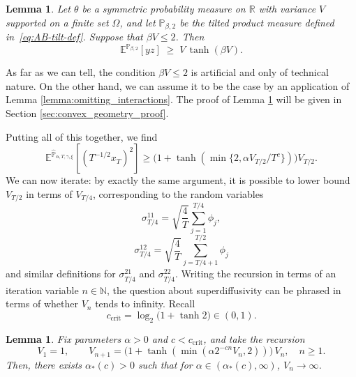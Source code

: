 \documentclass[reqno,11pt]{amsart}
\newcommand{\1}{\mathds{1}}
\theoremstyle{plain}
\newtheorem{lemma}[theorem]{Lemma}
\theoremstyle{definition}
\numberwithin{equation}{section}
\newcommand{\bbE}{{\mathbb E}}
\newcommand{\bbN}{{\mathbb N}}
\newcommand{\bbP}{{\mathbb P}}
\newcommand{\bbR}{{\mathbb R}}
\newcommand{\bbPh}{\hat{\bbP}}
\def\lt{\left}
\def\rt{\right}
\begin{document}
\begin{lemma}
    \label{lemma:AB-tanh_bound}
    Let \(\theta\) be a symmetric probability measure on \(\bbR\) with
    variance \(V\) supported on a finite set $\Omega$, and let \(\bbP_{\beta,2}\) be the tilted product measure
    defined in~\eqref{eq:AB-tilt-def}. Suppose that \(\beta V \le 2\).
    Then
    \[
        \bbE^{\bbP_{\beta,2}}[yz] \;\ge\; V\,\tanh(\beta V).
    \]
\end{lemma}
As far as we can tell, the condition $\beta V \le 2$ is artificial and only of technical nature. On the other hand, we can assume it to be the case by an application of Lemma \ref{lemma:omitting_interactions}.
The proof of Lemma \ref{lemma:AB-tanh_bound} will be given in Section \ref{sec:convex_geometry_proof}.

Putting all of this together, we find
$$\bbE^{\bbPh_{\alpha,T,\gamma,\xi}}\lt[ \lt( T^{-1/2} x_T  \rt)^2 \rt] \ge  \big( 1+\tanh(\min \{2,\alpha V_{T/2}/T^c\}) \big)V_{T/2}.$$
We can now iterate: by exactly the same argument, it is possible to lower bound $V_{T/2}$ in terms of $V_{T/4}$, corresponding to the random variables $$\sigma^{11}_{T/4} = \sqrt{\frac{4}{T}} \sum\limits_{j=1} ^{T/4} \phi_j,$$
$$\sigma^{12}_{T/4} = \sqrt{\frac{4}{T}} \sum\limits_{j=T/4 +1} ^{T/2} \phi_j$$
and similar definitions for 
$\sigma^{21}_{T/4}$ and $\sigma^{22}_{T/4}$. Writing the recursion in terms of an iteration variable $n \in \bbN$, the question about superdiffusivity can be phrased in terms of whether $V_n$ tends to infinity. Recall
\begin{equation}\label{eq:csat-def}
  c_{\mathrm{crit}} = \log_2\bigl(1+\tanh 2\bigr)\in(0,1).
\end{equation}

\begin{lemma}
    \label{lemma:Vn_growth}
    Fix parameters $\alpha>0$ and $c < c_\mathrm{crit}$, and take the recursion
\begin{equation}\label{eq:Vn-recursion}
  V_1 = 1,\qquad
  V_{n+1} = \bigl(1 + \tanh(\min(\alpha 2^{-cn}V_n,2))\bigr)\,V_n,
  \quad n\ge 1.
\end{equation}
Then, there exists $\alpha_*(c) > 0$ such that
for $\alpha \in (\alpha_* (c),\infty)$, $V_n \to \infty$.

\end{lemma}
\end{document}
